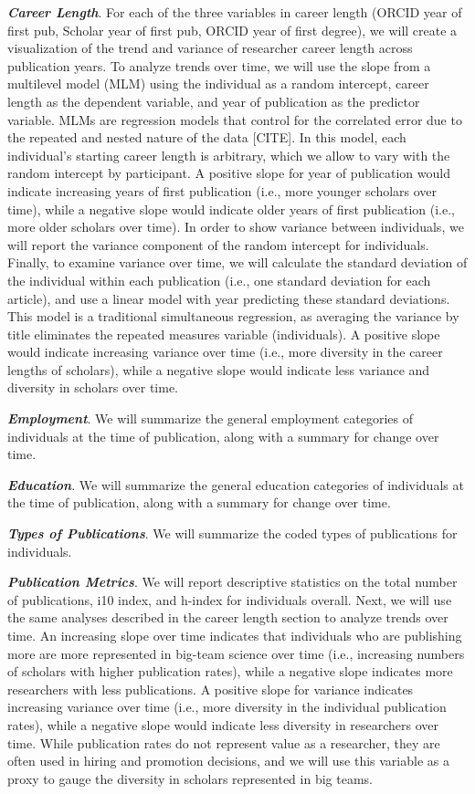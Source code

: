 \documentclass[
  man]{apa6}
\begin{document}
\textbf{\emph{Career Length}}. For each of the three variables in career length (ORCID year of first pub, Scholar year of first pub, ORCID year of first degree), we will create a visualization of the trend and variance of researcher career length across publication years. To analyze trends over time, we will use the slope from a multilevel model (MLM) using the individual as a random intercept, career length as the dependent variable, and year of publication as the predictor variable. MLMs are regression models that control for the correlated error due to the repeated and nested nature of the data {[}CITE{]}. In this model, each individual's starting career length is arbitrary, which we allow to vary with the random intercept by participant. A positive slope for year of publication would indicate increasing years of first publication (i.e., more younger scholars over time), while a negative slope would indicate older years of first publication (i.e., more older scholars over time). In order to show variance between individuals, we will report the variance component of the random intercept for individuals. Finally, to examine variance over time, we will calculate the standard deviation of the individual within each publication (i.e., one standard deviation for each article), and use a linear model with year predicting these standard deviations. This model is a traditional simultaneous regression, as averaging the variance by title eliminates the repeated measures variable (individuals). A positive slope would indicate increasing variance over time (i.e., more diversity in the career lengths of scholars), while a negative slope would indicate less variance and diversity in scholars over time.

\textbf{\emph{Employment}}. We will summarize the general employment categories of individuals at the time of publication, along with a summary for change over time.

\textbf{\emph{Education}}. We will summarize the general education categories of individuals at the time of publication, along with a summary for change over time.

\textbf{\emph{Types of Publications}}. We will summarize the coded types of publications for individuals.

\textbf{\emph{Publication Metrics}}. We will report descriptive statistics on the total number of publications, i10 index, and h-index for individuals overall. Next, we will use the same analyses described in the career length section to analyze trends over time. An increasing slope over time indicates that individuals who are publishing more are more represented in big-team science over time (i.e., increasing numbers of scholars with higher publication rates), while a negative slope indicates more researchers with less publications. A positive slope for variance indicates increasing variance over time (i.e., more diversity in the individual publication rates), while a negative slope would indicate less diversity in researchers over time. While publication rates do not represent value as a researcher, they are often used in hiring and promotion decisions, and we will use this variable as a proxy to gauge the diversity in scholars represented in big teams.
\end{document}
